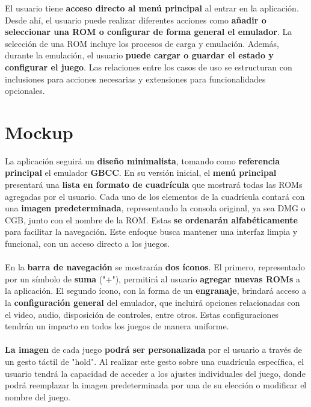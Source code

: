 El usuario tiene \textbf{acceso directo al menú principal} al entrar en la aplicación. Desde ahí, el usuario puede realizar diferentes acciones como \textbf{añadir o seleccionar una ROM o configurar de forma general el emulador}. La selección de una ROM incluye los procesos de carga y emulación. Además, durante la emulación, el usuario \textbf{puede cargar o guardar el estado y configurar el juego}. Las relaciones entre los casos de uso se estructuran con inclusiones para acciones necesarias y extensiones para funcionalidades opcionales.

\section{Mockup}

La aplicación seguirá un \textbf{diseño minimalista}, tomando como \textbf{referencia principal} el emulador \textbf{GBCC}. En su versión inicial, el \textbf{menú principal} presentará una \textbf{lista en formato de cuadrícula} que mostrará todas las ROMs agregadas por el usuario. Cada uno de los elementos de la cuadrícula contará con una \textbf{imagen predeterminada}, representando la consola original, ya sea DMG o CGB, junto con el nombre de la ROM. Estas \textbf{se ordenarán alfabéticamente} para facilitar la navegación. Este enfoque busca mantener una interfaz limpia y funcional, con un acceso directo a los juegos.
\\\\
En la \textbf{barra de navegación} se mostrarán \textbf{dos íconos}. El primero, representado por un símbolo de \textbf{suma} ("+"), permitirá al usuario \textbf{agregar nuevas ROMs} a la aplicación. El segundo ícono, con la forma de un \textbf{engranaje}, brindará acceso a la \textbf{configuración general} del emulador, que incluirá opciones relacionadas con el video, audio, disposición de controles, entre otros. Estas configuraciones tendrán un impacto en todos los juegos de manera uniforme.
\\\\
\textbf{La imagen} de cada juego \textbf{podrá ser personalizada} por el usuario a través de un gesto táctil de "hold". Al realizar este gesto sobre una cuadrícula específica, el usuario tendrá la capacidad de acceder a los ajustes individuales del juego, donde podrá reemplazar la imagen predeterminada por una de su elección o modificar el nombre del juego.

